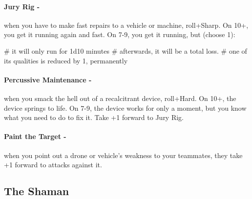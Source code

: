 \paragraph{Jury Rig -} when you have to make fast repairs to a vehicle or machine, roll+Sharp. On 10+, you get it running again and fast. On 7-9, you get it running, but (choose 1):
    \begin{easylist}
        # it will only run for 1d10 minutes
        # afterwards, it will be a total loss.
        # one of its qualities is reduced by 1, permanently
    \end{easylist}

\paragraph{Percussive Maintenance -} when you smack the hell out of a recalcitrant device, roll+Hard. On 10+, the device springs to life. On 7-9, the device works for only a moment, but you know what you need to do to fix it. Take +1 forward to Jury Rig.

\paragraph{Paint the Target -} when you point out a drone or vehicle’s weakness to your teammates, they take +1 forward to attacks against it.



\clearpage
\subsection{The Shaman}

